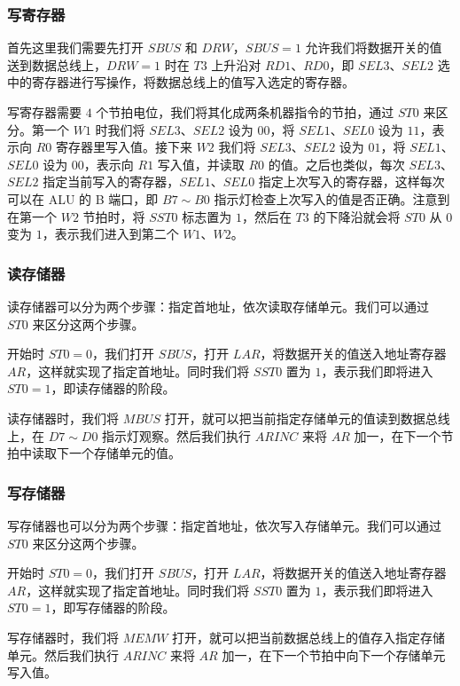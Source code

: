 \documentclass[12pt]{article}
\begin{document}
{        \subsubsection{写寄存器}
            首先这里我们需要先打开 $SBUS$ 和 $DRW$，$SBUS=1$ 允许我们将数据开关的值送到数据总线上，$DRW=1$ 时在 $T3$ 上升沿对 $RD1$、$RD0$，即 $SEL3$、$SEL2$ 选中的寄存器进行写操作，将数据总线上的值写入选定的寄存器。
            
            写寄存器需要 $4$ 个节拍电位，我们将其化成两条机器指令的节拍，通过 $ST0$ 来区分。第一个 $W1$ 时我们将 $SEL3$、$SEL2$ 设为 $00$，将 $SEL1$、$SEL0$ 设为 $11$，表示向 $R0$ 寄存器里写入值。接下来 $W2$ 我们将 $SEL3$、$SEL2$ 设为 $01$，将 $SEL1$、$SEL0$ 设为 $00$，表示向 $R1$ 写入值，并读取 $R0$ 的值。之后也类似，每次 $SEL3$、$SEL2$ 指定当前写入的寄存器，$SEL1$、$SEL0$ 指定上次写入的寄存器，这样每次可以在 ALU 的 B 端口，即 $B7\sim B0$ 指示灯检查上次写入的值是否正确。注意到在第一个 $W2$ 节拍时，将 $SST0$ 标志置为 $1$，然后在 $T3$ 的下降沿就会将 $ST0$ 从 $0$ 变为 $1$，表示我们进入到第二个 $W1$、$W2$。
        
        \subsubsection{读存储器}
            读存储器可以分为两个步骤：指定首地址，依次读取存储单元。我们可以通过 $ST0$ 来区分这两个步骤。
            
            开始时 $ST0=0$，我们打开 $SBUS$，打开 $LAR$，将数据开关的值送入地址寄存器 $AR$，这样就实现了指定首地址。同时我们将 $SST0$ 置为 $1$，表示我们即将进入 $ST0=1$，即读存储器的阶段。
            
            读存储器时，我们将 $MBUS$ 打开，就可以把当前指定存储单元的值读到数据总线上，在 $D7\sim D0$ 指示灯观察。然后我们执行 $ARINC$ 来将 $AR$ 加一，在下一个节拍中读取下一个存储单元的值。
        
        \subsubsection{写存储器}
            写存储器也可以分为两个步骤：指定首地址，依次写入存储单元。我们可以通过 $ST0$ 来区分这两个步骤。
           
            开始时 $ST0=0$，我们打开 $SBUS$，打开 $LAR$，将数据开关的值送入地址寄存器 $AR$，这样就实现了指定首地址。同时我们将 $SST0$ 置为 $1$，表示我们即将进入 $ST0=1$，即写存储器的阶段。
            
            写存储器时，我们将 $MEMW$ 打开，就可以把当前数据总线上的值存入指定存储单元。然后我们执行 $ARINC$ 来将 $AR$ 加一，在下一个节拍中向下一个存储单元写入值。
            
}
\end{document}
